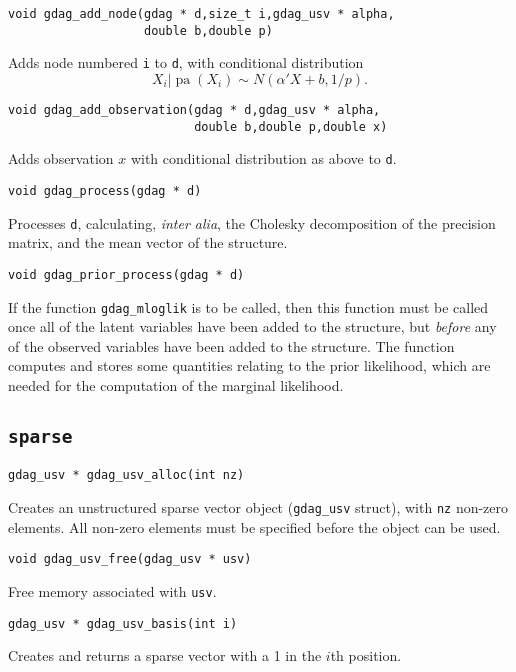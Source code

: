 \documentclass[12pt,a4paper]{article}
\newcommand{\pa}[1]{\operatorname{pa}(#1)}
\begin{document}
\begin{verbatim}
void gdag_add_node(gdag * d,size_t i,gdag_usv * alpha,
                   double b,double p)
\end{verbatim}
Adds node numbered \verb$i$ to \verb$d$, with conditional distribution
\[
X_i|\pa{X_i} \sim N(\alpha'X+b,1/p).
\]

\begin{verbatim}
void gdag_add_observation(gdag * d,gdag_usv * alpha,
                          double b,double p,double x)
\end{verbatim}
Adds observation $x$ with conditional distribution as above to \verb$d$.

\begin{verbatim}
void gdag_process(gdag * d)
\end{verbatim}
Processes \verb$d$, calculating, \emph{inter alia}, the Cholesky
decomposition of the precision matrix, and the mean vector of the
structure.

\begin{verbatim}
void gdag_prior_process(gdag * d)
\end{verbatim}
If the function \verb$gdag_mloglik$ is to be called, then this
function must be called once all of the latent variables have been
added to the structure, but \emph{before} any of the observed
variables have been added to the structure. The function computes and
stores some quantities relating to the prior likelihood, which are
needed for the computation of the marginal likelihood.

\subsection{\texttt{sparse}}

\begin{verbatim}
gdag_usv * gdag_usv_alloc(int nz)
\end{verbatim}
Creates an unstructured sparse vector object (\verb$gdag_usv$ struct), 
with \verb$nz$ non-zero elements. All non-zero elements must be
specified before the object can be used.

\begin{verbatim}
void gdag_usv_free(gdag_usv * usv)
\end{verbatim}
Free memory associated with \verb$usv$. 

\begin{verbatim}
gdag_usv * gdag_usv_basis(int i)
\end{verbatim}
Creates and returns a sparse vector with a 1 in the $i$th position.
\end{document}

